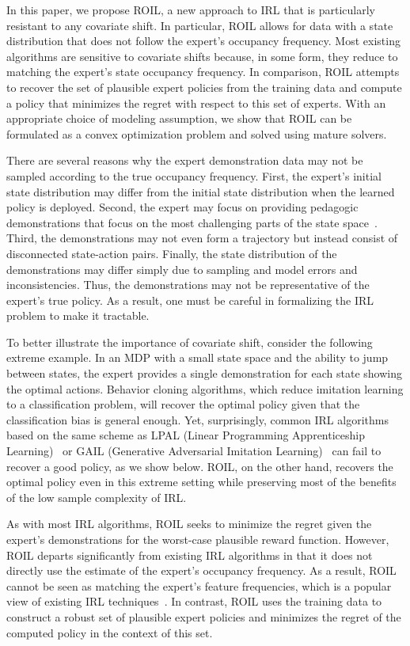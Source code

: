 In this paper, we propose ROIL, a new approach to IRL that is particularly resistant to any covariate shift. In particular, ROIL allows for data with a state distribution that does not follow the expert's occupancy frequency. Most existing algorithms are sensitive to covariate shifts because, in some form, they reduce to matching the expert's state occupancy frequency. In comparison, ROIL attempts to recover the set of plausible expert policies from the training data and compute a policy that minimizes the regret with respect to this set of experts. With an appropriate choice of modeling assumption, we show that ROIL can be formulated as a convex optimization problem and solved using mature solvers.

There are several reasons why the expert demonstration data may not be sampled according to the true occupancy frequency. First, the expert's initial state distribution may differ from the initial state distribution when the learned policy is deployed. Second, the expert may focus on providing pedagogic demonstrations that focus on the most challenging parts of the state space~\cite{cakmak2012algorithmic,hadfield2016cooperative,Brown2018b}. Third, the demonstrations may not even form a trajectory but instead consist of disconnected state-action pairs. Finally, the state distribution of the demonstrations may differ simply due to sampling and model errors and inconsistencies. Thus, the demonstrations may not be representative of the expert's true policy. As a result, one must be careful in formalizing the IRL problem to make it tractable.

To better illustrate the importance of covariate shift, consider the following extreme example. In an MDP with a small state space and the ability to jump between states, the expert provides a single demonstration for each state showing the optimal actions. Behavior cloning algorithms, which reduce imitation learning to a classification problem, will recover the optimal policy given that the classification bias is general enough. Yet, surprisingly, common IRL algorithms based on the same scheme as LPAL (Linear Programming Apprenticeship Learning)~\cite{Syed2008} or GAIL (Generative Adversarial Imitation Learning)~\cite{Ho2016} can fail to recover a good policy, as we show below. ROIL, on the other hand, recovers the optimal policy even in this extreme setting while preserving most of the benefits of the low sample complexity of IRL. %

As with most IRL algorithms, ROIL seeks to minimize the regret given the expert's demonstrations for the worst-case plausible reward function. However, ROIL departs significantly from existing IRL algorithms in that it does not directly use the estimate of the expert's occupancy frequency. As a result, ROIL cannot be seen as matching the expert's feature frequencies, which is a popular view of existing IRL techniques~\cite{abbeel2004,Syed2008,Ho2016}. In contrast, ROIL uses the training data to construct a robust set of plausible expert policies and minimizes the regret of the computed policy in the context of this set. 

